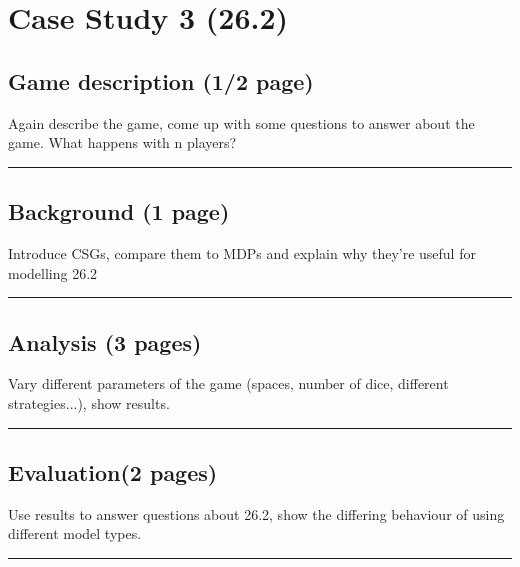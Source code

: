 \chapter{Case Study 3 (26.2)}
\label{ch:cs3}

\section{Game description (1/2 page)}

Again describe the game, come up with some questions to answer about the game. What happens with n players?

\hrule

\blindtext

\blindtext

\blindtext

\section{Background (1 page)}

Introduce CSGs, compare them to MDPs and explain why they're useful for modelling 26.2

\hrule

\Blindtext

\section{Analysis (3 pages)}

Vary different parameters of the game (spaces, number of dice, different strategies...), show results.

\hrule

\Blindtext

\Blindtext

\Blindtext

\section{Evaluation(2 pages)}

Use results to answer questions about 26.2, show the differing behaviour of using different model types.

\hrule

\Blindtext

\Blindtext